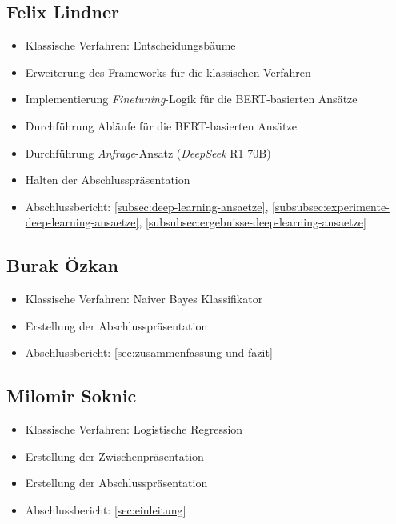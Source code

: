 \begin{multicols}{2}
\subsection{Felix Lindner}
\begin{itemize}
    \item Klassische Verfahren: Entscheidungsbäume
    \item Erweiterung des Frameworks für die klassischen Verfahren
    \item Implementierung \textit{Finetuning}-Logik für die BERT-basierten Ansätze
    \item Durchführung Abläufe für die BERT-basierten Ansätze
    \item Durchführung \textit{Anfrage}-Ansatz (\textit{DeepSeek} R1 70B)
    \item Halten der Abschlusspräsentation
    \item Abschlussbericht: \ref{subsec:deep-learning-ansaetze}, \ref{subsubsec:experimente-deep-learning-ansaetze}, \ref{subsubsec:ergebnisse-deep-learning-ansaetze}
\end{itemize}

\subsection{Burak Özkan}
\begin{itemize}
    \item Klassische Verfahren: Naiver Bayes Klassifikator
    \item Erstellung der Abschlusspräsentation
    \item Abschlussbericht: \ref{sec:zusammenfassung-und-fazit}
\end{itemize}

\subsection{Milomir Soknic}
\begin{itemize}
    \item Klassische Verfahren: Logistische Regression
    \item Erstellung der Zwischenpräsentation
    \item Erstellung der Abschlusspräsentation
    \item Abschlussbericht: \ref{sec:einleitung}
\end{itemize}

\end{multicols}
